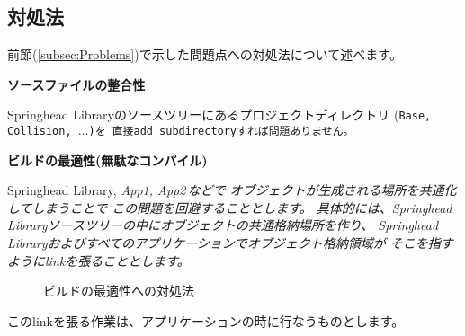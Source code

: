 \subsection{対処法}
\label{subsec:Solution}

\noindent
前節(\ref{subsec:Problems})で示した問題点への対処法について述べます。

\bigskip
\noindent
\bf{ソースファイルの整合性}
\begin{narrow}[20pt]
	Springhead Libraryのソースツリーにあるプロジェクトディレクトリ
	(\tt{Base}, \tt{Collision}, $\ldots$)を
	直接\tt{add\_subdirectory}すれば問題ありません。
\end{narrow}

\medskip
\noindent
\bf{ビルドの最適性(無駄なコンパイル)}
\begin{narrow}[20pt]
	Springhead Library, \it{App1, App2\,}などで
	オブジェクトが生成される場所を共通化してしまうことで
	この問題を回避することとします。
	具体的には、Springhead Libraryソースツリーの中にオブジェクトの共通格納場所を作り、
	Springhead Libraryおよびすべてのアプリケーションでオブジェクト格納領域が
	そこを指すようにlinkを張ることとします。

	\medskip
	\begin{figure}
    	\begin{narrow}\begin{minipage}{\textwidth}
		\medskip
    	\end{minipage}\end{narrow}
    	\begin{narrow}\begin{minipage}{\textwidth}
		\medskip
  	\end{minipage}\end{narrow}
	\caption{ビルドの最適性への対処法}
	\label{fig:SolutionToBuildOptimization}
	\end{figure}
	\medskip
	このlinkを張る作業は、アプリケーションの\cmake 時に行なうものとします。
\end{narrow}

